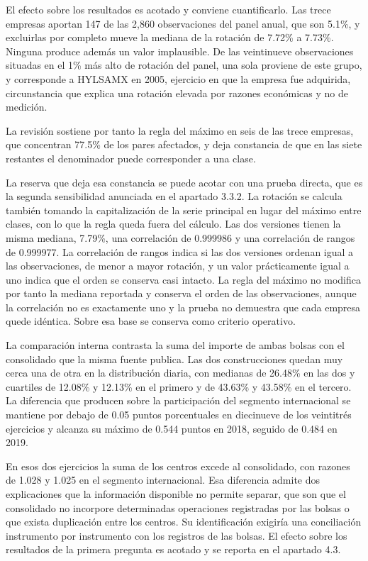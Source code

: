 El efecto sobre los resultados es acotado y conviene cuantificarlo. Las trece empresas aportan 147 de las 2,860 observaciones del panel anual, que son 5.1\%, y excluirlas por completo mueve la mediana de la rotación de 7.72\% a 7.73\%. Ninguna produce además un valor implausible. De las veintinueve observaciones situadas en el 1\% más alto de rotación del panel, una sola proviene de este grupo, y corresponde a HYLSAMX en 2005, ejercicio en que la empresa fue adquirida, circunstancia que explica una rotación elevada por razones económicas y no de medición.

La revisión sostiene por tanto la regla del máximo en seis de las trece empresas, que concentran 77.5\% de los pares afectados, y deja constancia de que en las siete restantes el denominador puede corresponder a una clase.

La reserva que deja esa constancia se puede acotar con una prueba directa, que es la segunda sensibilidad anunciada en el apartado 3.3.2. La rotación se calcula también tomando la capitalización de la serie principal en lugar del máximo entre clases, con lo que la regla queda fuera del cálculo. Las dos versiones tienen la misma mediana, 7.79\%, una correlación de 0.999986 y una correlación de rangos de 0.999977. La correlación de rangos indica si las dos versiones ordenan igual a las observaciones, de menor a mayor rotación, y un valor prácticamente igual a uno indica que el orden se conserva casi intacto. La regla del máximo no modifica por tanto la mediana reportada y conserva el orden de las observaciones, aunque la correlación no es exactamente uno y la prueba no demuestra que cada empresa quede idéntica. Sobre esa base se conserva como criterio operativo.


La comparación interna contrasta la suma del importe de ambas bolsas con el consolidado que la misma fuente publica. Las dos construcciones quedan muy cerca una de otra en la distribución diaria, con medianas de 26.48\% en las dos y cuartiles de 12.08\% y 12.13\% en el primero y de 43.63\% y 43.58\% en el tercero. La diferencia que producen sobre la participación del segmento internacional se mantiene por debajo de 0.05 puntos porcentuales en diecinueve de los veintitrés ejercicios y alcanza su máximo de 0.544 puntos en 2018, seguido de 0.484 en 2019.

En esos dos ejercicios la suma de los centros excede al consolidado, con razones de 1.028 y 1.025 en el segmento internacional. Esa diferencia admite dos explicaciones que la información disponible no permite separar, que son que el consolidado no incorpore determinadas operaciones registradas por las bolsas o que exista duplicación entre los centros. Su identificación exigiría una conciliación instrumento por instrumento con los registros de las bolsas. El efecto sobre los resultados de la primera pregunta es acotado y se reporta en el apartado 4.3.


